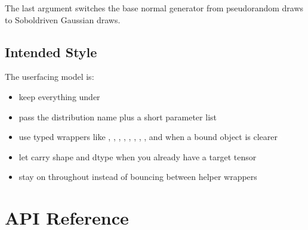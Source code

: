 \documentclass[letterpaper,10pt,english]{sphinxmanual}
\begin{document}
\sphinxAtStartPar
The last argument switches the base normal generator from pseudo\sphinxhyphen{}random draws to Sobol\sphinxhyphen{}driven Gaussian draws.


\section{Intended Style}
\label{\detokenize{quickstart:intended-style}}
\sphinxAtStartPar
The user\sphinxhyphen{}facing model is:
\begin{itemize}
\item {} 
\sphinxAtStartPar
keep everything under 

\item {} 
\sphinxAtStartPar
pass the distribution name plus a short parameter list

\item {} 
\sphinxAtStartPar
use typed wrappers like , , , , , , , , and  when a bound object is clearer

\item {} 
\sphinxAtStartPar
let  carry shape and dtype when you already have a target tensor

\item {} 
\sphinxAtStartPar
stay on  throughout instead of bouncing between helper wrappers

\end{itemize}

\sphinxstepscope


\chapter{API Reference}
\label{\detokenize{api_reference:api-reference}}\label{\detokenize{api_reference::doc}}

\section{}
\label{\detokenize{api_reference:supports}}
\end{document}
